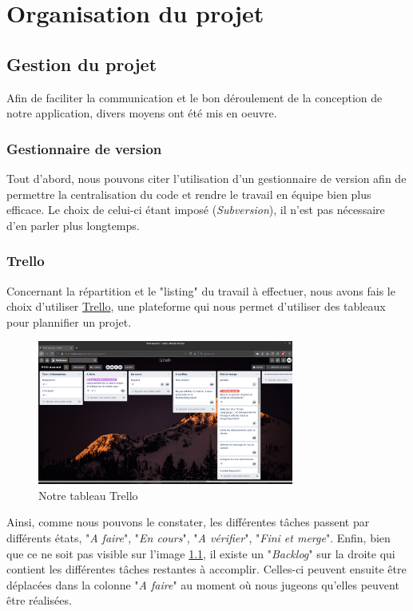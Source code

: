 \chapter{Organisation du projet}

	\section{Gestion du projet}

		Afin de faciliter la communication et le bon déroulement de la conception de notre application, divers moyens ont été mis en oeuvre.

		\subsection{Gestionnaire de version}

			Tout d'abord, nous pouvons citer l'utilisation d'un gestionnaire de version afin de permettre la centralisation du code et rendre le travail en équipe bien plus efficace. Le choix de celui-ci étant imposé (\textit{Subversion}), il n'est pas nécessaire d'en parler plus longtemps.

		\subsection{Trello}

			Concernant la répartition et le "listing" du travail à effectuer, nous avons fais le choix d'utiliser \href{https://trello.com}{Trello}, une plateforme qui nous permet d'utiliser des tableaux pour plannifier un projet.

			\begin{figure}[H]
				\centering\includegraphics[width=0.75\textwidth, keepaspectratio]{img/trello.png}
				\caption{Notre tableau Trello}
				\label{fig:trello}
			\end{figure}

			Ainsi, comme nous pouvons le constater, les différentes tâches passent par différents états, "\textit{A faire}", "\textit{En cours}", "\textit{A vérifier}", "\textit{Fini et merge}". Enfin, bien que ce ne soit pas visible sur l'image \ref{fig:trello}, il existe un "\textit{Backlog}" sur la droite qui contient les différentes tâches restantes à accomplir. Celles-ci peuvent ensuite être déplacées dans la colonne "\textit{A faire}" au moment où nous jugeons qu'elles peuvent être réalisées.

